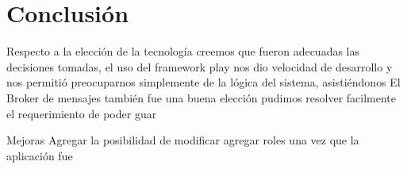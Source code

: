 \section{Conclusión}

Respecto a la elección de la tecnología creemos que fueron adecuadas las decisiones tomadas, el uso del framework play nos dio velocidad de desarrollo y nos permitió preocuparnos simplemente de la lógica del sistema, asistiéndonos 
El Broker de mensajes también fue una buena elección pudimos resolver facilmente el requerimiento de poder guar





Mejoras
Agregar la posibilidad de modificar agregar roles una vez que la aplicación fue 




